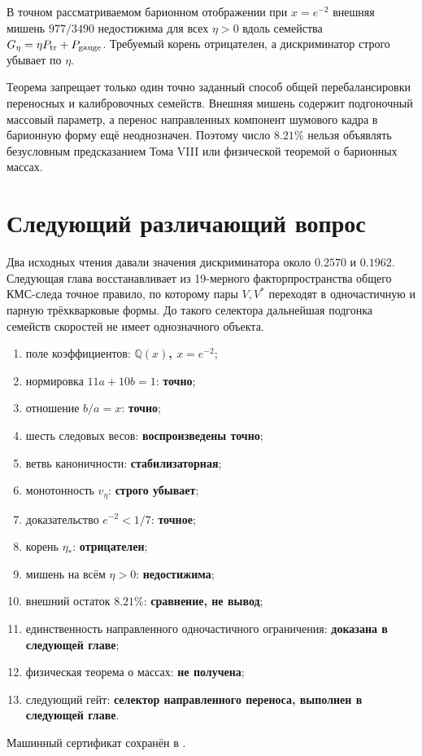 \begin{theorem}
В точном рассматриваемом барионном отображении при $x=e^{-2}$ внешняя мишень
$977/3490$ недостижима для всех $\eta>0$ вдоль семейства
$G_\eta=\eta P_{\rm tr}+P_{\rm gauge}$. Требуемый корень отрицателен, а
дискриминатор строго убывает по $\eta$.
\end{theorem}

\begin{nogocriterion}
Теорема запрещает только один точно заданный способ общей
перебалансировки переносных и калибровочных семейств. Внешняя мишень
содержит подгоночный массовый параметр, а перенос направленных компонент
шумового кадра в барионную форму ещё неоднозначен. Поэтому число
$8.21\%$ нельзя объявлять безусловным предсказанием Тома VIII или
физической теоремой о барионных массах.
\end{nogocriterion}

\section{Следующий различающий вопрос}

Два исходных чтения давали значения дискриминатора около $0.2570$ и
$0.1962$. Следующая глава восстанавливает из 19-мерного факторпространства общего КМС-следа
точное правило, по которому пары $V,V^*$ переходят в одночастичную и
парную трёхкварковые формы. До такого селектора дальнейшая подгонка
семейств скоростей не имеет однозначного объекта.

\begin{protocol}
\begin{enumerate}
 \item поле коэффициентов: \textbf{$\mathbb Q(x)$, $x=e^{-2}$};
 \item нормировка $11a+10b=1$: \textbf{точно};
 \item отношение $b/a=x$: \textbf{точно};
 \item шесть следовых весов: \textbf{воспроизведены точно};
 \item ветвь каноничности: \textbf{стабилизаторная};
 \item монотонность $v_\eta$: \textbf{строго убывает};
 \item доказательство $e^{-2}<1/7$: \textbf{точное};
 \item корень $\eta_*$: \textbf{отрицателен};
 \item мишень на всём $\eta>0$: \textbf{недостижима};
 \item внешний остаток $8.21\%$: \textbf{сравнение, не вывод};
 \item единственность направленного одночастичного ограничения:
 \textbf{доказана в следующей главе};
 \item физическая теорема о массах: \textbf{не получена};
 \item следующий гейт: \textbf{селектор направленного переноса, выполнен в следующей главе}.
\end{enumerate}
\end{protocol}

Машинный сертификат сохранён в
.